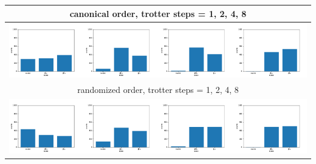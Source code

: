 \documentclass[]{standalone}
\begin{document}
\begin{tabular}{c}
\toprule
canonical order, trotter steps = 1, 2, 4, 8 \\
\midrule
\includegraphics[width=1.5\textwidth]{col_d_0_r_0_rc_0_steps_1_2_4_8.pdf} \\
\midrule
randomized order, trotter steps = 1, 2, 4, 8 \\
\midrule
\includegraphics[width=1.5\textwidth]{col_d_0_r_1_rc_0_steps_1_2_4_8.pdf} \\
\bottomrule
\end{tabular}
\end{document}
